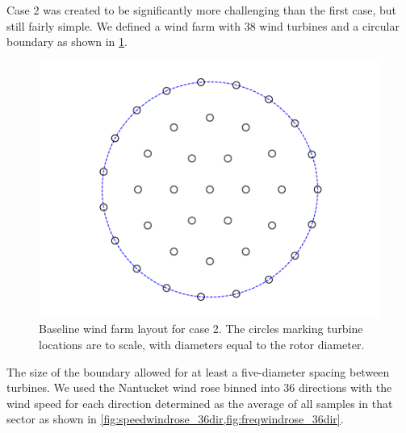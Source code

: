 \documentclass[a4paper]{jpconf}
\begin{document}
  Case 2 was created to be significantly more challenging than the first case, but still fairly simple. We defined a wind farm with 38 wind turbines and a circular boundary as shown in \cref{fig:round_case}. 
%
\begin{figure}[h!]
	\centering
	\begin{minipage}[t]{18pc}
		\centering
		\includegraphics[width=\textwidth, trim={1.5cm, 0cm, 1.5cm, 0cm}, clip]{final_images/layouts/38_turb_start.pdf}
		\caption{Baseline wind farm layout for case 2. The circles marking turbine locations are to scale, with diameters equal to the rotor diameter.}
		\label{fig:round_case}
	\end{minipage}\hspace{1pc}%
\end{figure}
%
The size of the boundary allowed for at least a five-diameter spacing between turbines. We used the Nantucket wind rose binned into 36 directions with the wind speed for each direction determined as the average of all samples in that sector as shown in \cref{fig:speedwindrose_36dir,fig:freqwindrose_36dir}.
%
\end{document}
